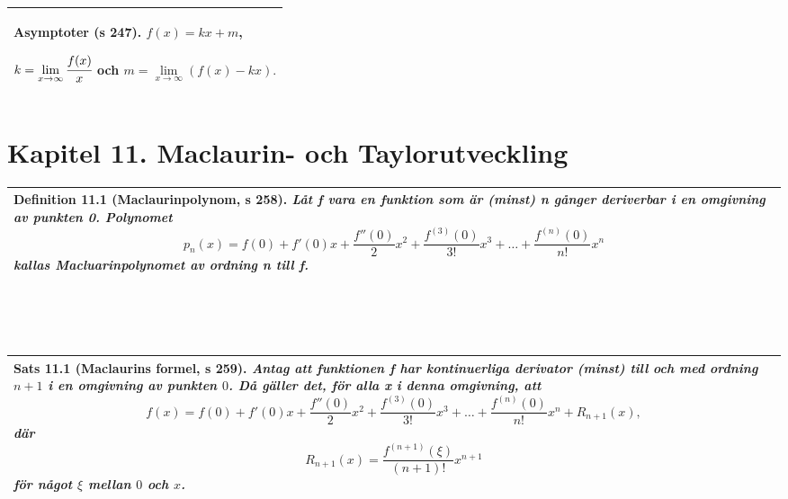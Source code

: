 \documentclass[a4paper]{article}
\begin{document}
\\\\\\
\begin{tabular}{|L{11.5cm}|} \hline
\textbf{Asymptoter} (s 247).
$f(x) = kx + m$,
\begin{center}
$k=\lim\limits_{x\rightarrow \infty}\cfrac{f(x)}{x}$ \hspace{0.5cm} och \hspace{0.5cm} $m=\lim\limits_{x\rightarrow \infty}(f(x)-kx).$
\end{center}
\\\hline
\end{tabular}
\section*{Kapitel 11. Maclaurin- och Taylorutveckling}
\begin{tabular}{|L{11.5cm}|} \hline
\textbf{Definition 11.1} (Maclaurinpolynom, s 258).
\textit{Låt f vara en funktion som är (minst) n gånger deriverbar i en omgivning av punkten 0. Polynomet}
\begin{displaymath}
p_n(x)=f(0)+f'(0)x+\frac{f''(0)}{2}x^2+\frac{f^{(3)}(0)}{3!}x^3+\ldots+\frac{f^{(n)}(0)}{n!}x^n
\end{displaymath}
\textit{kallas \textbf{Macluarinpolynomet} av \textbf{ordning} n till f.}
\\\hline
\end{tabular}
\\\\\\
\begin{tabular}{|L{11.5cm}|} \hline
\textbf{Sats 11.1} (Maclaurins formel, s 259).
\textit{Antag att funktionen f har kontinuerliga derivator (minst) till och med ordning $n + 1$ i en omgivning av punkten $0$. Då gäller det, för alla x i denna omgivning, att}
\begin{displaymath}
f(x)=f(0)+f'(0)x+\frac{f''(0)}{2}x^2+\frac{f^{(3)}(0)}{3!}x^3+\ldots+\frac{f^{(n)}(0)}{n!}x^n+R_{n+1}(x),
\end{displaymath}
\textit{där}
\begin{displaymath}
R_{n+1}(x) = \frac{f^{(n+1)}(\xi)}{(n+1)!}x^{n+1}
\end{displaymath}
\textit{för något $\xi$ mellan $0$ och $x$.}
\\\hline
\end{tabular}
\\\\\\
\end{document}
